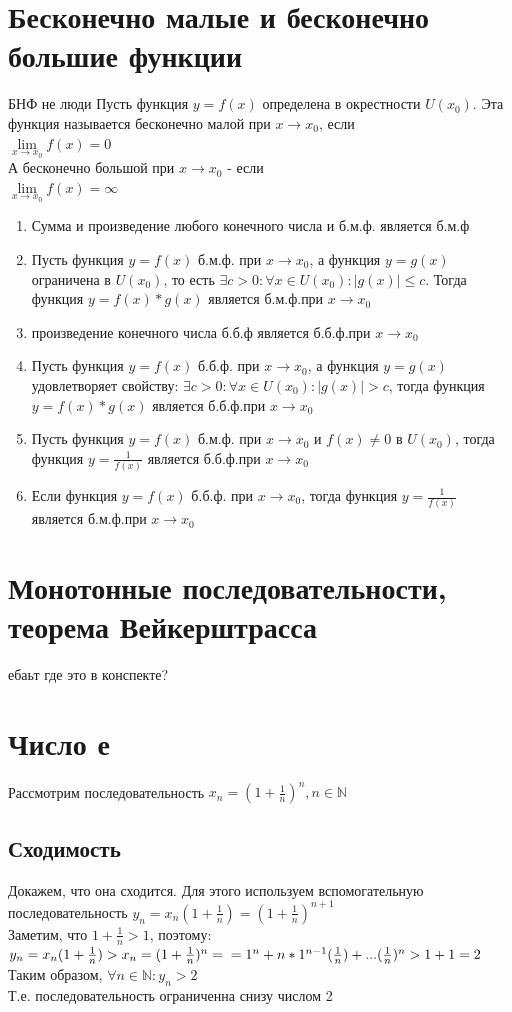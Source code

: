 \documentclass[oneside]{book}
\begin{document}
\begin{enumerate}
\chapter{Бесконечно малые и бесконечно большие функции}
БНФ не люди
Пусть функция $y = f(x)$ определена в окрестности $U(x_0)$. Эта функция называется бесконечно малой при $x \rightarrow x_0$, если\\ $\lim\limits_{x\rightarrow x_0}f(x)=0$\\
А бесконечно большой при $x \rightarrow x_0$ - если\\ $\lim\limits_{x\rightarrow x_0}f(x)=\infty$
\begin{enumerate}
\item Сумма и произведение любого конечного числа и б.м.ф. является б.м.ф
\item Пусть функция $y = f(x)$ б.м.ф. при $x \rightarrow x_0$, а функция $y = g(x)$ ограничена в $U(x_0)$, то есть  $\exists c > 0 : \forall x \in U(x_0): |g(x)|\leq c$. Тогда функция $y=f(x)*g(x)$ является б.м.ф.при $x \rightarrow x_0$
\item произведение конечного числа б.б.ф является б.б.ф.при $x \rightarrow x_0$
\item Пусть функция $y = f(x)$ б.б.ф. при $x \rightarrow x_0$, а функция $y = g(x)$ удовлетворяет свойству: $\exists c > 0 : \forall x \in U(x_0): |g(x)| > c$, тогда функция $y=f(x)*g(x)$ является б.б.ф.при $x \rightarrow x_0$
\item Пусть функция $y = f(x)$ б.м.ф. при $x \rightarrow x_0$ и $f(x) \neq 0$ в $U(x_0)$, тогда функция $y=\frac{1}{f(x)}$ является б.б.ф.при $x \rightarrow x_0$
\item Если функция $y = f(x)$ б.б.ф. при $x \rightarrow x_0$, тогда функция $y=\frac{1}{f(x)}$ является б.м.ф.при $x \rightarrow x_0$
\end{enumerate}

\chapter{Монотонные последовательности, теорема Вейкерштрасса}
ебаьт где это в конспекте?

\chapter{Число е}
Рассмотрим последовательность $x_n=(1+\frac{1}{n})^n, n \in \mathbb{N}$\\
\section{Сходимость}
Докажем, что она сходится. Для этого используем вспомогательную последовательность
$y_n=x_n(1+\frac{1}{n})=(1+\frac{1}{n})^{n+1}$\\
Заметим, что $1+\frac{1}{n}>1$, поэтому:\\ $y_n=x_n(1+\frac{1}{n})>x_n=(1+\frac{1}{n})^n=\\=1^n+n*1^{n-1}(\frac{1}{n})+...(\frac{1}{n})^n>1+1=2$
\\Таким образом, $\forall n \in \mathbb{N} :y_n>2$
\\Т.е. последовательность ограниченна снизу числом 2

\end{enumerate}
\end{document}
